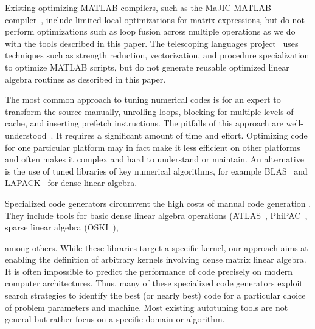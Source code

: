 \documentclass[runningheads]{llncs}
\begin{document}
Existing optimizing MATLAB compilers, such as the MaJIC MATLAB compiler~\cite{MaJIC},
include limited local optimizations for matrix expressions, but do not
perform optimizations such as loop fusion across multiple operations as we do
with the tools described in this paper. The telescoping languages
project~\cite{telescopingurl} uses techniques such as
strength reduction, vectorization, and procedure specialization to optimize
MATLAB scripts, but do not generate reusable optimized linear algebra
routines as described in this paper.

The most common approach to tuning numerical codes is for an expert to
transform the source manually, unrolling loops, blocking for multiple levels
of cache, and inserting prefetch instructions.  The pitfalls of this approach
are well-understood~\cite{Goedecker01}.  It requires a significant amount of
time and effort. Optimizing code for one particular platform may in fact make
it less efficient on other platforms and often makes it complex and hard to
understand or maintain.  An alternative is the use of tuned libraries of key
numerical algorithms, for example BLAS~\cite{Dongarra:1990fk} and
LAPACK~\cite{LAPACK} for dense linear algebra.

Specialized code generators circumvent the high costs of manual code
generation . They include tools for basic dense linear algebra operations
(ATLAS~\cite{WN147}, PhiPAC~\cite{bilmes97optimizing},
sparse linear algebra (OSKI~\cite{vuduc05}), 

among others.  While these libraries target a specific kernel, our approach aims 
at enabling the definition of arbitrary kernels involving dense matrix linear algebra.
It is often impossible to predict the performance of code precisely
on modern computer architectures. Thus, many of these specialized code
generators exploit search strategies to identify the best (or nearly best)
code for a particular choice of problem parameters and machine. Most existing
autotuning tools are not general but rather focus on a specific domain or algorithm.
\end{document}
